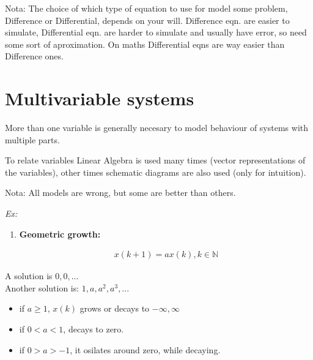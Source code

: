 \documentclass[a4paper,12pt]{article}
\begin{document}
    \begin{mdframed}{{\color{blue}Nota: }}
        The choice of which type of equation to use for model some problem, Difference
        or Differential, depends on your will. Difference eqn. are easier to simulate,
        Differential eqn. are harder to simulate and usually have error, so need 
        some sort of aproximation. On maths Differential eqns are way easier than 
        Difference ones.
    \end{mdframed}


    \section{Multivariable systems}
    
        More than one variable is generally necesary to model behaviour of 
        systems with multiple parts.

        To relate variables Linear Algebra is used many times (vector
        representations of the variables), other times schematic diagrams
        are also used (only for intuition).\\

        \begin{mdframed}{{\color{blue}Nota: }}
            All models are wrong, but some are better than others.
        \end{mdframed}

        \textit{Ex:}

        \begin{enumerate}
            \item \textbf{Geometric growth:} 

            \begin{align*}
                x(k + 1) =  ax(k), k \in  \mathbb{N}
            \end{align*}
        \end{enumerate}

        A solution is $0, 0, ...$\\
        Another solution is: $1, a, a^{2}, a^3, ...$

        \begin{itemize}
            \item if $a \geq 1$, $x(k)$ grows or decays to $-\infty, \infty$
            \item if $0 < a < 1$, decays to zero.
            \item if $0 > a > -1$, it osilates around zero, while decaying.
        \end{itemize}
\end{document}
